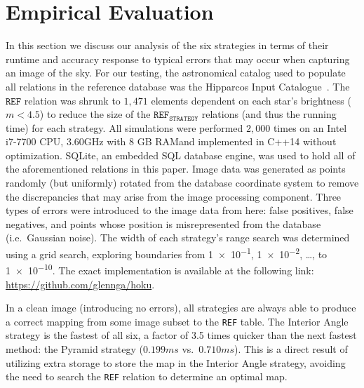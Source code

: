 \newcommand{\AVG}{\mathit{AVG}}

\section{Empirical Evaluation}\label{sec:empiricalEvaluation}
In this section we discuss our analysis of the six strategies in terms of their runtime and accuracy response to typical errors that may occur when capturing an image of the sky.
For our testing, the astronomical catalog used to populate all relations in the reference database was the Hipparcos Input Catalogue~\cite{perryman:hipparcosCatalogue}. 
The $\texttt{REF}$ relation was shrunk to $1{,}471$ elements dependent on each star's brightness ($m < 4.5$) to reduce the size of the $\texttt{REF}_\texttt{STRATEGY}$ relations (and thus the running time) for each strategy.
All simulations were performed $2{,}000$ times on an Intel i7-7700 CPU, 3.60GHz with 8 GB RAM\@ and implemented in C++14 without optimization.
SQLite, an embedded SQL database engine, was used to hold all of the aforementioned relations in this paper.
Image data was generated as points randomly (but uniformly) rotated from the database coordinate system to remove the discrepancies that may arise from the image processing component.
Three types of errors were introduced to the image data from here: false positives, false negatives, and points whose position is misrepresented from the database (i.e.\ Gaussian noise).
The width of each strategy's range search was determined using a grid search, exploring boundaries from \num{1e-1}, \num{1e-2}, \ldots, to \num{1e-10}.
The exact implementation is available at the following link: \url{https://github.com/glennga/hoku}.

In a clean image (introducing no errors), all strategies are always able to produce a correct mapping from some image subset to the \texttt{REF} table.
The Interior Angle strategy is the fastest of all six, a factor of 3.5 times quicker than the next fastest method: the Pyramid strategy ($0.199\si{ms}$ vs.\ $0.710\si{ms}$).
This is a direct result of utilizing extra storage to store the map in the Interior Angle strategy, avoiding the need to search the \texttt{REF} relation to determine an optimal map.

